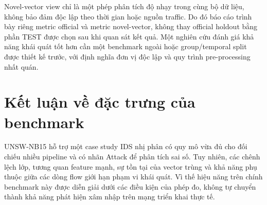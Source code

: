 Novel-vector view chỉ là một phép phân tích độ nhạy trong cùng bộ dữ liệu, không bảo đảm độc lập theo thời gian hoặc nguồn traffic. Do đó báo cáo trình bày riêng metric official và metric novel-vector, không thay official holdout bằng phần TEST được chọn sau khi quan sát kết quả. Một nghiên cứu đánh giá khả năng khái quát tốt hơn cần một benchmark ngoài hoặc group/temporal split được thiết kế trước, với định nghĩa đơn vị độc lập và quy trình pre-processing nhất quán.

\section{Kết luận về đặc trưng của benchmark}
UNSW-NB15 hỗ trợ một case study IDS nhị phân có quy mô vừa đủ cho đối chiếu nhiều pipeline và có nhãn Attack để phân tích sai số. Tuy nhiên, các chênh lệch lớp, tương quan feature mạnh, sự tồn tại của vector trùng và khả năng phụ thuộc giữa các dòng flow giới hạn phạm vi khái quát. Vì thế hiệu năng trên chính benchmark này được diễn giải dưới các điều kiện của phép đo, không tự chuyển thành khả năng phát hiện xâm nhập trên mạng triển khai thực tế.
